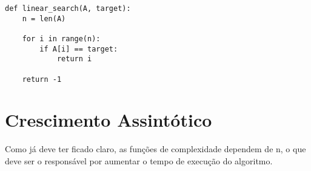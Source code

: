 \documentclass[ a4paper, twocolumn]{article}
\begin{document}
\begin{lstlisting}[label=linear_search,caption= Busca sequêncial]
def linear_search(A, target):
    n = len(A)

    for i in range(n):
        if A[i] == target:
            return i
    
    return -1
\end{lstlisting}

\section{Crescimento Assintótico}
Como já deve ter ficado claro, as funções de complexidade dependem de n, o que deve ser o responsável por aumentar o tempo de execução do algoritmo.

\end{document}
